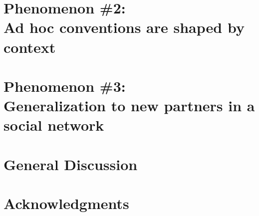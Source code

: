 \documentclass[11pt, floatsintext]{apa6}
\begin{document}


\section{Phenomenon \#2: \\Ad hoc conventions are shaped by context}



\section{Phenomenon \#3: \\Generalization to new partners in a social network}



\section{General Discussion}



\section{\bf Acknowledgments}
\small




\renewcommand{\thefigure}{A\arabic{figure}}
\renewcommand{\thetable}{A\arabic{table}}
\setcounter{table}{0}
\setcounter{figure}{0}
\end{document}
